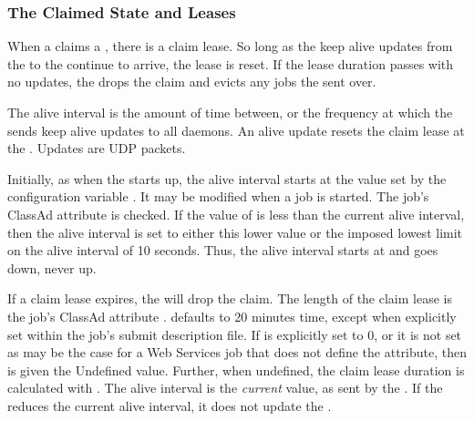 \subsubsection{\label{sec:ClaimedState} The Claimed State and Leases}

When a  claims a , there is a claim lease.
So long as the keep alive updates from the  to the
 continue to arrive, the lease is reset.
If the lease duration passes with no updates,
the  drops the claim and evicts any jobs the
 sent over.

The alive interval is the amount of time between,
or the frequency at which the  sends keep alive updates 
to all  daemons.
An alive update resets the claim lease at the .
Updates are UDP packets.

Initially, as when the  starts up,
the alive interval starts at the value set by the 
configuration variable .  
It may be modified when a job is started.
The job's ClassAd attribute  is checked.
If the value of  is less than the current
alive interval,
then the alive interval is set to either this lower value
or the imposed lowest limit on the alive interval of 10 seconds.
Thus, the alive interval starts at  and goes down,
never up.

If a claim lease expires,
the  will drop the claim.
The length of the claim lease is 
the job's ClassAd attribute .
 defaults to 20 minutes time,
except when explicitly
set within the job's submit description file.
If  is explicitly set to 0, 
or it is not set as may be the case for a Web Services job
that does not define the attribute, 
then  is given the Undefined value.
Further, when undefined,
the claim lease duration is calculated with
.
The alive interval is the \emph{current} value,
as sent by the .
If the  reduces the current alive interval,
it does not update the .


